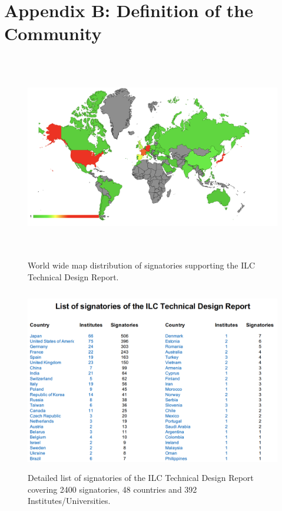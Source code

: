 \documentclass[%
 reprint,
 amsmath,amssymb,
 aps,
]{revtex4-1}
\begin{document}
\newpage

\section*{\label{Appendix2} \Large{Appendix B: Definition of the Community}} 
\begin{figure}[h]
 \begin{center}
 \includegraphics[width=\hsize,height=9cm]{figures/WorldSignatoriesTDR.png}
\caption{World wide map distribution of signatories supporting the ILC Technical Design Report. \label{TDRsignatories}}
 \end{center}
 \end{figure}
 
 \begin{figure}[h]
 \begin{center}
 \includegraphics[width=\hsize,height=8cm]{figures/CountriesInstitutes.png}
\caption{Detailed list of signatories of the ILC Technical Design Report covering 2400 signatories, 48 countries and 392 Institutes/Universities. \label{TDRsignatories}}
 \end{center}
 \end{figure}
\end{document}

